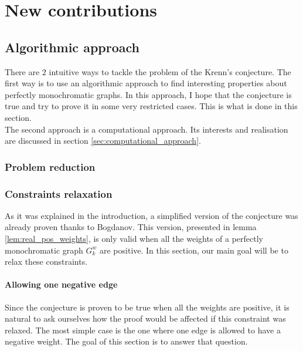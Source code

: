 \chapter{New contributions}


\section{Algorithmic approach}
\label{sec:algo_approach}

There are $2$ intuitive ways to tackle the problem of the Krenn's conjecture. The first way is to use an algorithmic approach to find interesting properties about perfectly monochromatic graphs. In this approach, I hope that the conjecture is true and try to prove it in some very restricted cases. This is what is done in this section.\\

The second approach is a computational approach. Its interests and realisation are discussed in section \ref{sec:computational_approach}.

\subsection{Problem reduction}
\label{sec:problem_reduction}

\subsection{Constraints relaxation}
\label{sec:constraints_relaxation}

As it was explained in the introduction, a simplified version of the conjecture was already proven thanks to Bogdanov. \cite{bogdanov} This version, presented in lemma \ref{lem:real_pos_weights}, is only valid when all the weights of a perfectly monochromatic graph $G_k^w$ are positive. In this section, our main goal will be to relax these constraints.

\subsubsection{Allowing one negative edge}
\label{sec:one_negative_edge}

Since the conjecture is proven to be true when all the weights are positive, it is natural to ask ourselves how the proof would be affected if this constraint was relaxed. The most simple case is the one where one edge is allowed to have a negative weight. The goal of this section is to answer that question.


